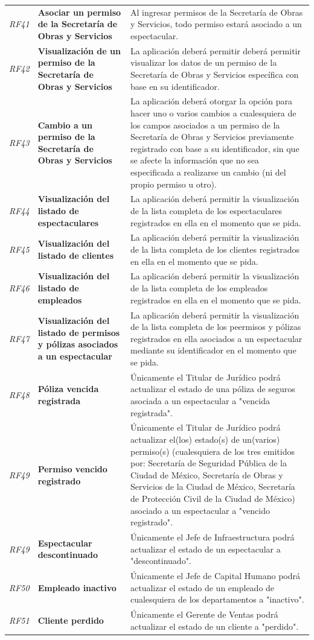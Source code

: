\documentclass[12pt]{article}
\begin{document}
{\begin{longtable}[H]{m{2cm}m{4cm}m{6cm}}
     \textit{RF41} & \textbf{Asociar un permiso de la Secretaría de Obras y Servicios} & Al ingresar permisos de la Secretaría de Obras y Servicios, todo permiso estará asociado a un espectacular. \tabularnewline
     \textit{RF42} & \textbf{Visualización de un permiso de la Secretaría de Obras y Servicios} & La aplicación deberá permitir deberá permitir visualizar los datos de un permiso de la Secretaría de Obras y Servicios específica con base en su identificador.\tabularnewline
     \textit{RF43} & \textbf{Cambio a un permiso de la Secretaría de Obras y Servicios} & La aplicación deberá otorgar la opción para hacer uno o varios cambios a cualesquiera de los campos asociados a un permiso de la Secretaría de Obras y Servicios previamente registrado con base a su identificador, sin que se afecte la información que no sea especificada a realizarse un cambio (ni del propio permiso u otro).\tabularnewline
     \textit{RF44} & \textbf{Visualización del listado de espectaculares} & La aplicación deberá permitir la visualización de la lista completa de los espectaculares registrados en ella en el momento que se pida.\tabularnewline
     \textit{RF45} & \textbf{Visualización del listado de clientes} & La aplicación deberá permitir la visualización de la lista completa de los clientes registrados en ella en el momento que se pida.\tabularnewline
     \textit{RF46} & \textbf{Visualización del listado de empleados} & La aplicación deberá permitir la visualización de la lista completa de los empleados registrados en ella en el momento que se pida.\tabularnewline
     \textit{RF47} & \textbf{Visualización del listado de permisos y pólizas asociados a un espectacular} & La aplicación deberá permitir la visualización de la lista completa de los peermisos y pólizas registrados en ella asociados a un espectacular mediante su identificador en el momento que se pida.\tabularnewline
     \textit{RF48} & \textbf{Póliza vencida registrada}& Únicamente el Titular de Jurídico podrá actualizar el estado de una póliza de seguros asociada a un espectacular a "vencida registrada".\tabularnewline
     \textit{RF49} & \textbf{Permiso vencido registrado}& Únicamente el Titular de Jurídico podrá actualizar el(los) estado(s) de un(varios) permiso(s) (cualesquiera de los tres emitidos por: Secretaría de Seguridad Pública de la Ciudad de México, Secretaría de Obras y Servicios de la Ciudad de México, Secretaría de Protección Civil de la Ciudad de México) asociado a un espectacular a "vencido registrado".\tabularnewline
     \textit{RF49} & \textbf{Espectacular descontinuado} & Únicamente el Jefe de Infraestructura podrá actualizar el estado de un espectacular a "descontinuado".\tabularnewline
     \textit{RF50} & \textbf{Empleado inactivo} & Únicamente el Jefe de Capital Humano podrá actualizar el estado de un empleado de cualesquiera de los departamentos a "inactivo".\tabularnewline
     \textit{RF51} & \textbf{Cliente perdido} & Únicamente el Gerente de Ventas podrá actualizar el estado de un cliente a "perdido".\tabularnewline
     
    \bottomrule
    
\end{longtable}
}
\newpage
\end{document}
